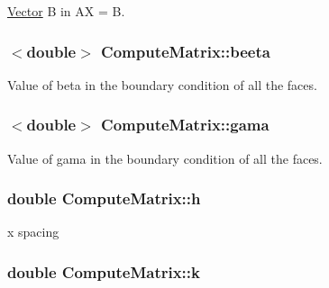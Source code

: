\hyperlink{class_vector}{Vector} B in A\+X = B. 

\hypertarget{class_compute_matrix_a870eba0db8cadb9bb5297250b33b8110}{}
\subsubsection[{beeta}]{$<$double$>$ Compute\+Matrix\+::beeta\hspace{0.3cm}{\ttfamily [private]}}\label{class_compute_matrix_a870eba0db8cadb9bb5297250b33b8110}


Value of beta in the boundary condition of all the faces. 

\hypertarget{class_compute_matrix_a4ce47d86505bff39d030ee28dceb1ca4}{}
\subsubsection[{gama}]{$<$double$>$ Compute\+Matrix\+::gama\hspace{0.3cm}{\ttfamily [private]}}\label{class_compute_matrix_a4ce47d86505bff39d030ee28dceb1ca4}


Value of gama in the boundary condition of all the faces. 

\hypertarget{class_compute_matrix_ae43490e192b2e3ea685e7cf7c35186a8}{}
\subsubsection[{h}]{\setlength{\rightskip}{0pt plus 5cm}double Compute\+Matrix\+::h\hspace{0.3cm}{\ttfamily [private]}}\label{class_compute_matrix_ae43490e192b2e3ea685e7cf7c35186a8}


x spacing 

\hypertarget{class_compute_matrix_ae498ccb8e95e23dcf562c310fba18b6c}{}
\subsubsection[{k}]{\setlength{\rightskip}{0pt plus 5cm}double Compute\+Matrix\+::k\hspace{0.3cm}{\ttfamily [private]}}\label{class_compute_matrix_ae498ccb8e95e23dcf562c310fba18b6c}


